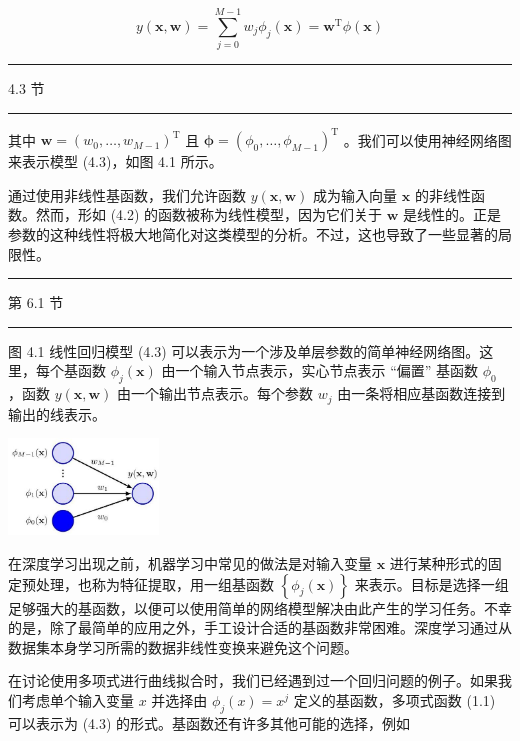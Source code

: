 \documentclass[10pt]{report}
\newcommand{\HRule}{\begin{center}\rule{0.9\linewidth}{0.2mm}\end{center}}
\begin{document}
\[
y\left( {\mathbf{x},\mathbf{w}}\right)  = \mathop{\sum }\limits_{{j = 0}}^{{M - 1}}{w}_{j}{\phi }_{j}\left( \mathbf{x}\right)  = {\mathbf{w}}^{\mathrm{T}}\phi \left( \mathbf{x}\right)  \tag{4.3}
\]

\HRule

4.3 节

\HRule

其中 \(\mathbf{w} = {\left( {w}_{0},\ldots ,{w}_{M - 1}\right) }^{\mathrm{T}}\) 且 \(\mathbf{\phi } = {\left( {\phi }_{0},\ldots ,{\phi }_{M - 1}\right) }^{\mathrm{T}}\) 。我们可以使用神经网络图来表示模型 (4.3)，如图 4.1 所示。

通过使用非线性基函数，我们允许函数 \(y\left( {\mathbf{x},\mathbf{w}}\right)\) 成为输入向量 \(\mathbf{x}\) 的非线性函数。然而，形如 (4.2) 的函数被称为线性模型，因为它们关于 \(\mathbf{w}\) 是线性的。正是参数的这种线性将极大地简化对这类模型的分析。不过，这也导致了一些显著的局限性。

\HRule

第 6.1 节

\HRule

图 4.1 线性回归模型 (4.3) 可以表示为一个涉及单层参数的简单神经网络图。这里，每个基函数 \({\phi }_{j}\left( \mathbf{x}\right)\) 由一个输入节点表示，实心节点表示 “偏置” 基函数 \({\phi }_{0}\) ，函数 \(y\left( {\mathbf{x},\mathbf{w}}\right)\) 由一个输出节点表示。每个参数 \({w}_{j}\) 由一条将相应基函数连接到输出的线表示。

\begin{center}
\includegraphics[max width=0.3\textwidth]{images/0194e279-9b28-703a-88f4-c3ac21e2010d_132_1083_345_456_293_0.jpg}
\end{center}
\hspace*{3em} 

在深度学习出现之前，机器学习中常见的做法是对输入变量 \(\mathbf{x}\) 进行某种形式的固定预处理，也称为特征提取，用一组基函数 \(\left\{  {{\phi }_{j}\left( \mathbf{x}\right) }\right\}\) 来表示。目标是选择一组足够强大的基函数，以便可以使用简单的网络模型解决由此产生的学习任务。不幸的是，除了最简单的应用之外，手工设计合适的基函数非常困难。深度学习通过从数据集本身学习所需的数据非线性变换来避免这个问题。

在讨论使用多项式进行曲线拟合时，我们已经遇到过一个回归问题的例子。如果我们考虑单个输入变量 \(x\) 并选择由 \({\phi }_{j}\left( x\right)  = {x}^{j}\) 定义的基函数，多项式函数 (1.1) 可以表示为 (4.3) 的形式。基函数还有许多其他可能的选择，例如
\end{document}
